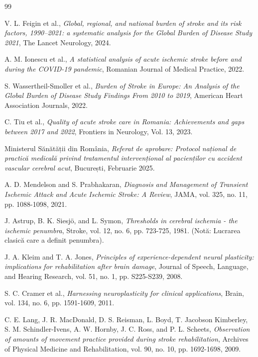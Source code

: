 \begin{thebibliography}{99}

V. L. Feigin et al., \textit{Global, regional, and national burden of stroke and its risk factors, 1990–2021: a systematic analysis for the Global Burden of Disease Study 2021}, The Lancet Neurology, 2024.

A. M. Ionescu et al., \textit{A statistical analysis of acute ischemic stroke before and during the COVID-19 pandemic}, Romanian Journal of Medical Practice, 2022.

S. Wassertheil-Smoller et al., \textit{Burden of Stroke in Europe: An Analysis of the Global Burden of Disease Study Findings From 2010 to 2019}, American Heart Association Journals, 2022.

C. Tiu et al., \textit{Quality of acute stroke care in Romania: Achievements and gaps between 2017 and 2022}, Frontiers in Neurology, Vol. 13, 2023.

Ministerul Sănătății din România, \textit{Referat de aprobare: Protocol național de practică medicală privind tratamentul intervențional al pacienților cu accident vascular cerebral acut}, București, Februarie 2025.

A. D. Mendelson and S. Prabhakaran, \textit{Diagnosis and Management of Transient Ischemic Attack and Acute Ischemic Stroke: A Review}, JAMA, vol. 325, no. 11, pp. 1088-1098, 2021.

J. Astrup, B. K. Siesjö, and L. Symon, \textit{Thresholds in cerebral ischemia - the ischemic penumbra}, Stroke, vol. 12, no. 6, pp. 723-725, 1981. (Notă: Lucrarea clasică care a definit penumbra).

J. A. Kleim and T. A. Jones, \textit{Principles of experience-dependent neural plasticity: implications for rehabilitation after brain damage}, Journal of Speech, Language, and Hearing Research, vol. 51, no. 1, pp. S225-S239, 2008.

S. C. Cramer et al., \textit{Harnessing neuroplasticity for clinical applications}, Brain, vol. 134, no. 6, pp. 1591-1609, 2011.

C. E. Lang, J. R. MacDonald, D. S. Reisman, L. Boyd, T. Jacobson Kimberley, S. M. Schindler-Ivens, A. W. Hornby, J. C. Ross, and P. L. Scheets, \textit{Observation of amounts of movement practice provided during stroke rehabilitation}, Archives of Physical Medicine and Rehabilitation, vol. 90, no. 10, pp. 1692-1698, 2009.


\end{thebibliography}
